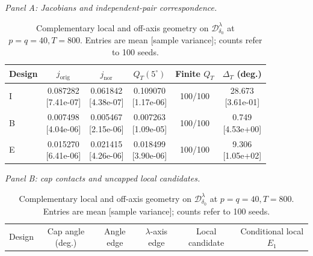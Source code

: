 \documentclass[12pt,letterpaper]{article}
\def\spacingset#1{\renewcommand{\baselinestretch}{#1}\small\normalsize}
\theoremstyle{plain}
\theoremstyle{definition}
\begin{document}
\clearpage
\begin{table}[p]
\begingroup
\spacingset{1.0}
\small\centering
\caption{Complementary local and off-axis geometry on $\mathcal D^\lambda_{\delta_0}$ at $p=q=40,T=800$. Entries are mean [sample variance]; counts refer to 100 seeds.}
\label{s23:lambda:selectedtab:cap_correspondence}
\footnotesize
\setlength{\tabcolsep}{3pt}
\renewcommand{\arraystretch}{1.03}
\textit{Panel A: Jacobians and independent-pair correspondence.}\par\smallskip
\begin{adjustbox}{max width=\linewidth}
\begin{tabular}{lccccc}
\toprule
Design & $j_{\mathrm{orig}}$ & $j_{\mathrm{nor}}$ & $Q_T(5^\circ)$ & Finite $Q_T$ & $\Delta_T$ (deg.)\\
\midrule
I & \shortstack{0.087282\\[-1pt]{\scriptsize[7.41e-07]}} & \shortstack{0.061842\\[-1pt]{\scriptsize[4.38e-07]}} & \shortstack{0.109070\\[-1pt]{\scriptsize[1.17e-06]}} & 100/100 & \shortstack{28.673\\[-1pt]{\scriptsize[3.61e-01]}}\\
B & \shortstack{0.007498\\[-1pt]{\scriptsize[4.04e-06]}} & \shortstack{0.005467\\[-1pt]{\scriptsize[2.15e-06]}} & \shortstack{0.007263\\[-1pt]{\scriptsize[1.09e-05]}} & 100/100 & \shortstack{0.749\\[-1pt]{\scriptsize[4.53e+00]}}\\
E & \shortstack{0.015270\\[-1pt]{\scriptsize[6.41e-06]}} & \shortstack{0.021415\\[-1pt]{\scriptsize[4.26e-06]}} & \shortstack{0.018499\\[-1pt]{\scriptsize[3.90e-06]}} & 100/100 & \shortstack{9.306\\[-1pt]{\scriptsize[1.05e+02]}}\\
\bottomrule
\end{tabular}
\end{adjustbox}
\par\smallskip
\textit{Panel B: cap contacts and uncapped local candidates.}\par\smallskip
\begin{adjustbox}{max width=\linewidth}
\begin{tabular}{lccccc}
\toprule
Design & Cap angle (deg.) & Angle edge & $\lambda$-axis edge & Local candidate & Conditional local $E_1$\\

\end{tabular}
\end{adjustbox}
\end{table}
\end{document}
